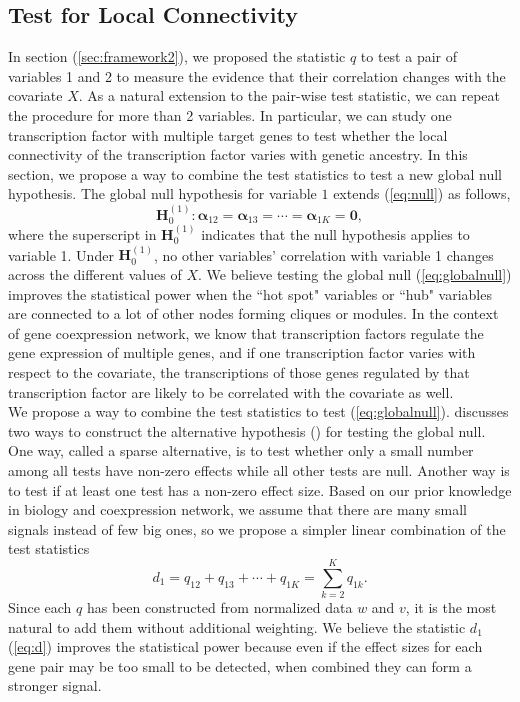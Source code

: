 \documentclass[aap,authoryear, preprint]{imsart}
\numberwithin{equation}{section}
\theoremstyle{plain}
\begin{document}
\subsection{Test for Local Connectivity \label{sec:frameworkK}} 
In section (\ref{sec:framework2}), we proposed the statistic $q$ to test a pair of variables 1 and 2 to measure the evidence that their correlation changes with the covariate $X$. As a natural extension to the pair-wise test statistic, we can repeat the procedure for more than 2 variables. In particular, we can study one transcription factor with  multiple target genes to test whether the local connectivity of the transcription factor varies with genetic ancestry. In this section, we propose a way to combine the test statistics to test a new global null hypothesis. The global null hypothesis for variable $1$ extends (\ref{eq:null}) as follows,
\begin{equation}
    \bm{H}_0^{(1)}: \bm{\alpha}_{12} = \bm{\alpha}_{13} = \cdots = \bm{\alpha}_{1K} = \bm{0},
\label{eq:globalnull}
\end{equation}
where the superscript in $\bm{H}_0^{(1)}$ indicates that the null hypothesis applies to variable 1. Under $\bm{H}_0^{(1)}$, no other variables' correlation with variable 1 changes across the different values of  $X$. We believe testing the global null (\ref{eq:globalnull}) improves the statistical power when the ``hot spot" variables or ``hub" variables are connected to a lot of other nodes forming cliques or modules. In the context of gene coexpression network, we know that transcription factors regulate the gene expression of multiple genes, and if one transcription factor varies with respect to the covariate, the transcriptions of those genes regulated by that transcription factor are likely to be correlated with the covariate as well. \\

We propose a way to combine the test statistics to test (\ref{eq:globalnull}). \cite{chen2012exponential} discusses two ways to construct the alternative hypothesis (\cite{chen2012exponential}) for testing the global null. One way, called a sparse alternative, is to test whether only a small number among all tests have non-zero effects while all other tests are null. Another way is to test if at least one test has a non-zero effect size. Based on our prior knowledge in biology and coexpression network, we assume that there are many small signals instead of few big ones, so we propose a simpler linear combination of the test statistics
\begin{equation}
d_1 = {q}_{12} + {q}_{13} + \cdots + {q}_{1K} = \sum_{k=2}^{K} {q}_{1k}.
\label{eq:d}
\end{equation}
Since each $q$ has been constructed from normalized data $w$ and $v$, it is the most natural to add them without additional weighting. We believe the statistic $d_1$ (\ref{eq:d}) improves the statistical power because even if the effect sizes for each gene pair may be too small to be detected, when combined they can form a stronger signal. \\
\end{document}
